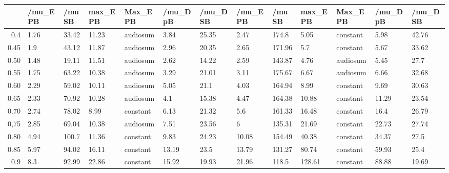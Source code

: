 \begin{table}[ht]
\centering
\begin{tabular}{rllllllllllll}
  \hline
 & /mu\_E PB & /mu SB & max\_E PB & Max\_E PB & /mu\_D pB & /mu\_D SB & /mu\_E PB & /mu SB & max\_E PB & Max\_E PB & /mu\_D pB & /mu\_D SB \\ 
  \hline
0.4 & 1.76 & 33.42 & 11.23 & audiosum & 3.84 & 25.35 & 2.47 & 174.8 & 5.05 & constant & 5.98 & 42.76 \\ 
  0.45 & 1.9 & 43.12 & 11.87 & audiosum & 2.96 & 20.35 & 2.65 & 171.96 & 5.7 & constant & 5.67 & 33.62 \\ 
  0.50 & 1.48 & 19.11 & 11.51 & audiosum & 2.62 & 14.22 & 2.59 & 143.87 & 4.76 & audiosum & 5.45 & 27.7 \\ 
  0.55 & 1.75 & 63.22 & 10.38 & audiosum & 3.29 & 21.01 & 3.11 & 175.67 & 6.67 & audiosum & 6.66 & 32.68 \\ 
  0.60 & 2.29 & 59.02 & 10.11 & audiosum & 5.05 & 21.1 & 4.03 & 164.94 & 8.99 & constant & 9.69 & 30.63 \\ 
  0.65 & 2.33 & 70.92 & 10.28 & audiosum & 4.1 & 15.38 & 4.47 & 164.38 & 10.88 & constant & 11.29 & 23.54 \\ 
  0.70 & 2.74 & 78.02 & 8.99 & constant & 6.13 & 21.32 & 5.6 & 161.33 & 16.48 & constant & 16.4 & 26.79 \\ 
  0,75 & 2.85 & 69.04 & 10.38 & audiosum & 7.51 & 23.56 & 6 & 135.31 & 21.69 & constant & 22.73 & 27.74 \\ 
  0.80 & 4.94 & 100.7 & 11.36 & constant & 9.83 & 24.23 & 10.08 & 154.49 & 40.38 & constant & 34.37 & 27.5 \\ 
  0.85 & 5.97 & 94.02 & 16.11 & constant & 13.19 & 23.5 & 13.79 & 131.27 & 80.74 & constant & 59.93 & 25.4 \\ 
  0.9 & 8.3 & 92.99 & 22.86 & constant & 15.92 & 19.93 & 21.96 & 118.5 & 128.61 & constant & 88.88 & 19.69 \\ 
   \hline
\end{tabular}
\end{table}
